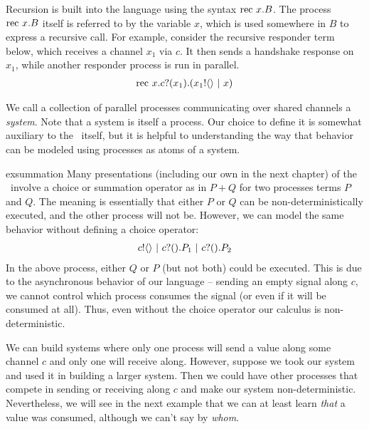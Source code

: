 	Recursion is built into the language using the syntax $\text{rec }{x}.B$.  The process $\text{rec }{x}.B$ itself is referred to by the variable $x$, which is used somewhere in $B$ to express a recursive call.  For example, consider the recursive responder term below, which receives a channel $x_1$ via $c$.  It then sends a handshake response on $x_1$, while another responder process is run in parallel.
	\begin{align}
		\text{rec }{x}.{c}?({x_1}).({x_1}!\langle{}\rangle \ |\  x)
		\label{reclistenerterm}
	\end{align}
	
	We call a collection of parallel processes communicating over shared channels a \emph{system}.  Note that a system is itself a process.    Our choice to define it is somewhat auxiliary to the \picalc\ itself, but it is helpful to understanding the way that behavior can be modeled using processes as atoms of a system.
\begin{example}{exsummation}
	 Many presentations (including our own in the next chapter) of the \picalc\ involve a choice or summation operator as in $P+Q$ for two processes terms $P$ and $Q$.  The meaning is essentially that either $P$ or $Q$ can be non-deterministically executed, and the other process will not be.  However, we can model the same behavior without defining a choice operator:
	\begin{align}
		{c}!\langle{}\rangle \ |\  {c}?({}).P_1 \ |\  {c}?({}).P_2
	\end{align}
	In the above process, either $Q$ or $P$ (but not both) could be executed.  This is due to the asynchronous behavior of our language -- sending an empty signal along $c$, we cannot control which process consumes the signal (or even if it will be consumed at all). Thus, even without the choice operator our calculus is non-deterministic.
	
	We can build systems where only one process will send a value along some channel $c$ and only one will receive along.  However, suppose we took our system and used it in building a larger system.  Then we could have other processes that compete in sending or receiving along $c$ and make our system non-deterministic.  Nevertheless, we will see in the next example that we can at least learn \emph{that} a value was consumed, although we can't say by \emph{whom}.\end{example}
